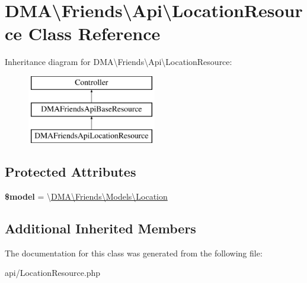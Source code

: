 \hypertarget{classDMA_1_1Friends_1_1Api_1_1LocationResource}{}\section{D\+M\+A\textbackslash{}Friends\textbackslash{}Api\textbackslash{}Location\+Resource Class Reference}
\label{classDMA_1_1Friends_1_1Api_1_1LocationResource}
Inheritance diagram for D\+M\+A\textbackslash{}Friends\textbackslash{}Api\textbackslash{}Location\+Resource\+:\begin{figure}[H]
\begin{center}
\leavevmode
\includegraphics[height=3.000000cm]{d3/d3e/classDMA_1_1Friends_1_1Api_1_1LocationResource}
\end{center}
\end{figure}
\subsection*{Protected Attributes}
\begin{DoxyCompactItemize}
\item 
\hypertarget{classDMA_1_1Friends_1_1Api_1_1LocationResource_a32a593bbeba6c699743670fda7bae672}{}{\bfseries \$model} = \textquotesingle{}\textbackslash{}\hyperlink{classDMA_1_1Friends_1_1Models_1_1Location}{D\+M\+A\textbackslash{}\+Friends\textbackslash{}\+Models\textbackslash{}\+Location}\textquotesingle{}\label{classDMA_1_1Friends_1_1Api_1_1LocationResource_a32a593bbeba6c699743670fda7bae672}

\end{DoxyCompactItemize}
\subsection*{Additional Inherited Members}


The documentation for this class was generated from the following file\+:\begin{DoxyCompactItemize}
\item 
api/Location\+Resource.\+php\end{DoxyCompactItemize}
